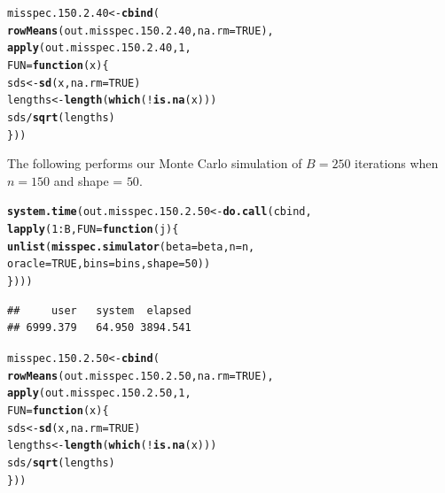 \documentclass[11pt]{article}\usepackage[]{graphicx}\usepackage[]{color}
\makeatletter
\newcommand{\hlnum}[1]{\textcolor[rgb]{0.686,0.059,0.569}{#1}}%
\newcommand{\hlopt}[1]{\textcolor[rgb]{0,0,0}{#1}}%
\newcommand{\hlstd}[1]{\textcolor[rgb]{0.345,0.345,0.345}{#1}}%
\newcommand{\hlkwa}[1]{\textcolor[rgb]{0.161,0.373,0.58}{\textbf{#1}}}%
\newcommand{\hlkwb}[1]{\textcolor[rgb]{0.69,0.353,0.396}{#1}}%
\newcommand{\hlkwc}[1]{\textcolor[rgb]{0.333,0.667,0.333}{#1}}%
\newcommand{\hlkwd}[1]{\textcolor[rgb]{0.737,0.353,0.396}{\textbf{#1}}}%
\newenvironment{kframe}{%
 \def\at@end@of@kframe{}%
 \ifinner\ifhmode%
  \def\at@end@of@kframe{\end{minipage}}%
  \begin{minipage}{\columnwidth}%
 \fi\fi%
 \def\FrameCommand##1{\hskip\@totalleftmargin \hskip-\fboxsep
 \colorbox{shadecolor}{##1}\hskip-\fboxsep
     \hskip-\linewidth \hskip-\@totalleftmargin \hskip\columnwidth}%
 \MakeFramed {\advance\hsize-\width
   \@totalleftmargin\z@ \linewidth\hsize
   \@setminipage}}%
 {\par\unskip\endMakeFramed%
 \at@end@of@kframe}
\newenvironment{knitrout}{}{} %
\makeatother
\begin{document}
\begin{knitrout}
\color{fgcolor}\begin{kframe}
\begin{alltt}
\hlstd{misspec.150.2.40} \hlkwb{<-} \hlkwd{cbind}\hlstd{(}
  \hlkwd{rowMeans}\hlstd{(out.misspec.150.2.40,} \hlkwc{na.rm} \hlstd{=} \hlnum{TRUE}\hlstd{),}
  \hlkwd{apply}\hlstd{(out.misspec.150.2.40,} \hlnum{1}\hlstd{,}
  \hlkwc{FUN} \hlstd{=} \hlkwa{function}\hlstd{(}\hlkwc{x}\hlstd{)\{}
    \hlstd{sds} \hlkwb{<-} \hlkwd{sd}\hlstd{(x,} \hlkwc{na.rm} \hlstd{=} \hlnum{TRUE}\hlstd{)}
    \hlstd{lengths} \hlkwb{<-} \hlkwd{length}\hlstd{(}\hlkwd{which}\hlstd{(}\hlopt{!}\hlkwd{is.na}\hlstd{(x)))}
    \hlstd{sds} \hlopt{/} \hlkwd{sqrt}\hlstd{(lengths)}
  \hlstd{\}))}
\end{alltt}
\end{kframe}
\end{knitrout}

The following performs our Monte Carlo simulation of $B = 250$ iterations 
when $n = 150$ and shape = $50$.

\begin{knitrout}
\color{fgcolor}\begin{kframe}
\begin{alltt}
\hlkwd{system.time}\hlstd{(out.misspec.150.2.50} \hlkwb{<-} \hlkwd{do.call}\hlstd{(cbind,}
  \hlkwd{lapply}\hlstd{(}\hlnum{1}\hlopt{:}\hlstd{B,} \hlkwc{FUN} \hlstd{=} \hlkwa{function}\hlstd{(}\hlkwc{j}\hlstd{)\{}
    \hlkwd{unlist}\hlstd{(}\hlkwd{misspec.simulator}\hlstd{(}\hlkwc{beta} \hlstd{= beta,} \hlkwc{n} \hlstd{= n,}
      \hlkwc{oracle} \hlstd{=} \hlnum{TRUE}\hlstd{,} \hlkwc{bins} \hlstd{= bins,} \hlkwc{shape} \hlstd{=} \hlnum{50}\hlstd{))}
\hlstd{\})))}
\end{alltt}
\begin{verbatim}
##     user   system  elapsed 
## 6999.379   64.950 3894.541
\end{verbatim}
\end{kframe}
\end{knitrout}

\begin{knitrout}
\color{fgcolor}\begin{kframe}
\begin{alltt}
\hlstd{misspec.150.2.50} \hlkwb{<-} \hlkwd{cbind}\hlstd{(}
  \hlkwd{rowMeans}\hlstd{(out.misspec.150.2.50,} \hlkwc{na.rm} \hlstd{=} \hlnum{TRUE}\hlstd{),}
  \hlkwd{apply}\hlstd{(out.misspec.150.2.50,} \hlnum{1}\hlstd{,}
  \hlkwc{FUN} \hlstd{=} \hlkwa{function}\hlstd{(}\hlkwc{x}\hlstd{)\{}
    \hlstd{sds} \hlkwb{<-} \hlkwd{sd}\hlstd{(x,} \hlkwc{na.rm} \hlstd{=} \hlnum{TRUE}\hlstd{)}
    \hlstd{lengths} \hlkwb{<-} \hlkwd{length}\hlstd{(}\hlkwd{which}\hlstd{(}\hlopt{!}\hlkwd{is.na}\hlstd{(x)))}
    \hlstd{sds} \hlopt{/} \hlkwd{sqrt}\hlstd{(lengths)}
  \hlstd{\}))}
\end{alltt}
\end{kframe}
\end{knitrout}
\end{document}
